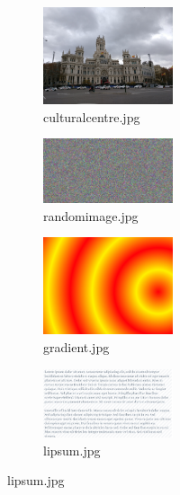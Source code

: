 \documentclass[12pt]{article}
\begin{document}
\begin{figure}[H]
	\begin{subfigure}[b]{0.26\textwidth}
		\includegraphics[width = 1.5in]{culturalcentre.jpg}
		\caption{culturalcentre.jpg}
	\end{subfigure}%
	\begin{subfigure}[b]{0.26\textwidth}
		\includegraphics[width = 1.5in]{randomimage.jpg}
		\caption{randomimage.jpg}
	\end{subfigure}%
	\begin{subfigure}[b]{0.26\textwidth}
		\includegraphics[width = 1.5in]{gradient.jpg}
		\caption{gradient.jpg}
	\end{subfigure}%
	\begin{subfigure}[b]{0.26\textwidth}
		\includegraphics[width = 1.5in]{lipsum.jpg}
		\caption{lipsum.jpg}
	\end{subfigure}
	

\end{figure}
\end{document}
